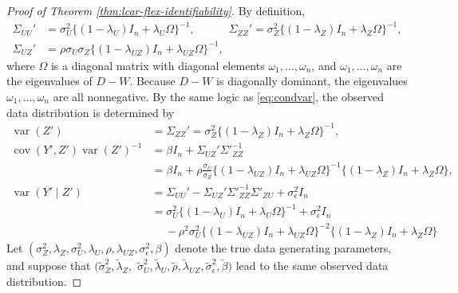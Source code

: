 \documentclass[11pt]{article}
\theoremstyle{definition}
\theoremstyle{remark}
\DeclareMathOperator{\var}{var}
\DeclareMathOperator{\cov}{cov}
\begin{document}
\begin{proof}[Proof of Theorem \ref{thm:lcar-flex-identifiability}]
By definition, 
\begin{align*}
    \Sigma_{UU}' & = \sigma_U^2 \{ (1-\lambda_U) I_n + \lambda_U \Omega \}^{-1}, 
    \qquad \quad 
    \Sigma_{ZZ}' = \sigma_Z^2 \{ (1-\lambda_Z) I_n + \lambda_Z \Omega \}^{-1}, \\
    \Sigma_{UZ}' & = \rho \sigma_U \sigma_Z \{ (1-\lambda_{UZ} )I_n + \lambda_{UZ} \Omega \}^{-1}, 
\end{align*}
where $\Omega$ is a diagonal matrix with diagonal elements $\omega_1, \ldots, \omega_n$, and $\omega_1, \ldots, \omega_n$ are the eigenvalues of $D-W$. 
Because $D-W$ is diagonally dominant, the eigenvalues $\omega_1, \ldots, \omega_n$ are all nonnegative. 
By the same logic as \eqref{eq:condvar}, the observed data distribution is determined by 
\begin{align}\label{eq:lcar_obs}
    \var(Z') & = \Sigma_{ZZ}'
    = \sigma_Z^2 \{ (1-\lambda_Z) I_n + \lambda_Z \Omega \}^{-1}, 
    \nonumber\\
    \cov(Y', Z') \var(Z')^{-1} & = \beta I_n + \Sigma_{UZ}' \Sigma'^{-1}_{ZZ}
    \nonumber
    \\
    & =\beta I_n + \rho \frac{\sigma_U}{ \sigma_Z} \{ (1-\lambda_{UZ} )I_n + \lambda_{UZ} \Omega \}^{-1} \{ (1-\lambda_Z) I_n + \lambda_Z \Omega \},
    \nonumber
    \\
    \var(Y' \mid Z') & = \Sigma_{UU}' - \Sigma_{UZ}' \Sigma'^{-1}_{ZZ} \Sigma'_{ZU} + \sigma_{\epsilon}^2 I_n
    \nonumber
    \\
    & = 
    \sigma_U^2 \{ (1-\lambda_U) I_n + \lambda_U \Omega \}^{-1} + \sigma_{\epsilon}^2 I_n
    \nonumber
    \\
    & \quad \ 
    - 
    \rho^2 \sigma_U^2 \{ (1-\lambda_{UZ} )I_n + \lambda_{UZ} \Omega \}^{-2}
     \{ (1-\lambda_Z) I_n + \lambda_Z \Omega \} 
\end{align}
Let $(\sigma_Z^2, \lambda_Z, \sigma_U^2, \lambda_U, \rho, \lambda_{UZ}, \sigma_\epsilon^2, \beta)$ denote the true data generating parameters, and suppose that $(\tilde\sigma_Z^2, \tilde\lambda_Z, $ $\tilde\sigma_U^2, \tilde\lambda_U, \tilde\rho, \tilde\lambda_{UZ}, \tilde\sigma_\epsilon^2, \tilde\beta)$ lead to the same observed data distribution.


\end{proof}
\end{document}
